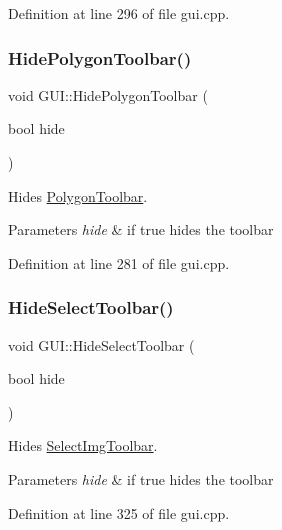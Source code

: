 Definition at line 296 of file gui.\+cpp.

\mbox{\label{classGUI_aaf633cd0904e4c3627c21219f330c177}} 
\subsubsection{\texorpdfstring{Hide\+Polygon\+Toolbar()}{HidePolygonToolbar()}}
{\footnotesize\ttfamily void G\+U\+I\+::\+Hide\+Polygon\+Toolbar (\begin{DoxyParamCaption}\item[{bool}]{hide }\end{DoxyParamCaption})}



Hides \mbox{\hyperlink{structPolygonToolbar}{Polygon\+Toolbar}}. 


\begin{DoxyParams}{Parameters}
{\em hide} & if true hides the toolbar \\
\hline
\end{DoxyParams}


Definition at line 281 of file gui.\+cpp.

\mbox{\label{classGUI_a7f6d3b1fcbd874fccd93c5f29c468ed8}} 
\subsubsection{\texorpdfstring{Hide\+Select\+Toolbar()}{HideSelectToolbar()}}
{\footnotesize\ttfamily void G\+U\+I\+::\+Hide\+Select\+Toolbar (\begin{DoxyParamCaption}\item[{bool}]{hide }\end{DoxyParamCaption})}



Hides \mbox{\hyperlink{structSelectImgToolbar}{Select\+Img\+Toolbar}}. 


\begin{DoxyParams}{Parameters}
{\em hide} & if true hides the toolbar \\
\hline
\end{DoxyParams}


Definition at line 325 of file gui.\+cpp.

